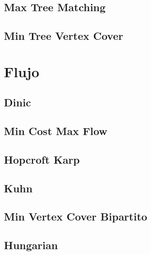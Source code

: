 \documentclass[a4paper,11pt,landscape,twocolumn]{article}
\begin{document}
\subsection{Max Tree Matching}



\subsection{Min Tree Vertex Cover}



\section{Flujo}

\subsection{Dinic}



\subsection{Min Cost Max Flow}



\subsection{Hopcroft Karp}



\subsection{Kuhn}



\subsection{Min Vertex Cover Bipartito}



\subsection{Hungarian}
\end{document}
